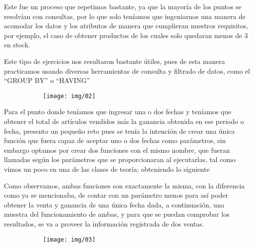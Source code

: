 \documentclass[letterpaper,12pt]{article}
\begin{document}
	Este fue un proceso que repetimos bastante, ya que la mayoría de los puntos se resolvían con consultas, por lo que solo teníamos que ingeniarnos una manera de acomodar los datos y los atributos de manera que cumplieran nuestros requisitos, por ejemplo, el caso de obtener productos de los cuales solo quedaran menos de 3 en stock.
	
		
		
	Este tipo de ejercicios nos resultaron bastante útiles, pues de esta manera practicamos usando diversas herramientas de consulta y filtrado de datos, como el “GROUP BY” o “HAVING”
	
	\begin{figure}[H]

		\begin{subfigure}{20cm}

			\centering

			\texttt{[image: img/02]}

		\end{subfigure}

	\end{figure}
	
	Para el punto donde teníamos que ingresar una o dos fechas y teníamos que obtener el total de artículos vendidos más la ganancia obtenida en ese periodo o fecha, presento un pequeño reto pues se tenía la intención de crear una única función que fuera capaz de aceptar uno o dos fechas como parámetros, sin embargo optamos  por crear dos funciones con el mismo nombre, que fueran llamadas según los parámetros que se proporcionaran al ejecutarlas, tal como vimos un poco en una de las clases de teoría; obteniendo lo siguiente
	
	
	
	Como observamos, ambas funciones son exactamente la misma, con la diferencia como ya se mencionaba, de contar con un parámetro menos para así poder obtener la venta y ganancia de una única fecha dada, a continuación, una muestra del funcionamiento de ambas, y para que se puedan comprobar los resultados, se va a proveer la información registrada de dos ventas.
	
	
	\begin{figure}[H]

		\begin{subfigure}{20cm}

			\centering

			\texttt{[image: img/03]}

		\end{subfigure}

	\end{figure}
\end{document}
